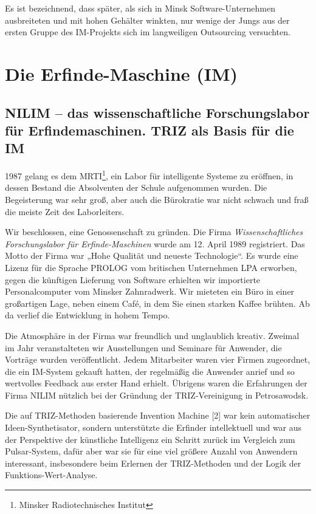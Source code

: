 \documentclass[11pt,a4paper]{article}
\begin{document}
Es ist bezeichnend, dass später, als sich in Minsk Software-Unternehmen
ausbreiteten und mit hohen Gehälter winkten, nur wenige der Jungs aus der
ersten Gruppe des IM-Projekts sich im langweiligen Outsourcing versuchten.

\section{Die Erfinde-Maschine (IM)}
\subsection{NILIM -- das wissenschaftliche Forschungslabor für
  Erfindemaschinen.  TRIZ als Basis für die IM}

1987 gelang es dem MRTI\footnote{Minsker Radiotechnisches Institut}, ein Labor
für intelligente Systeme zu eröffnen, in dessen Bestand die Absolventen der
Schule aufgenommen wurden. Die Begeisterung war sehr groß, aber auch die
Bürokratie war nicht schwach und fraß die meiste Zeit des Laborleiters.

Wir beschlossen, eine Genossenschaft zu gründen. Die Firma
\emph{Wissenschaftliches Forschungslabor für Erfinde-Maschinen} wurde am
12. April 1989 registriert. Das Motto der Firma war „Hohe Qualität und neueste
Technologie“. Es wurde eine Lizenz für die Sprache PROLOG vom britischen
Unternehmen LPA erworben, gegen die künftigen Lieferung von Software erhielten
wir importierte Personalcomputer vom Minsker Zahnradwerk. Wir mieteten ein
Büro in einer großartigen Lage, neben einem Café, in dem Sie einen starken
Kaffee brühten. Ab da verlief die Entwicklung in hohem Tempo.

Die Atmosphäre in der Firma war freundlich und unglaublich kreativ. Zweimal im
Jahr veranstalteten wir Ausstellungen und Seminare für Anwender, die Vorträge
wurden veröffentlicht. Jedem Mitarbeiter waren vier Firmen zugeordnet, die ein
IM-System gekauft hatten, der regelmäßig die Anwender anrief und so wertvolles
Feedback aus erster Hand erhielt. Übrigens waren die Erfahrungen der Firma
NILIM nützlich bei der Gründung der TRIZ-Vereinigung in Petrosawodsk.

Die auf TRIZ-Methoden basierende Invention Machine [2] war kein automatischer
Ideen-Synthetisator, sondern unterstützte die Erfinder intellektuell und war
aus der Perspektive der künstliche Intelligenz ein Schritt zurück im Vergleich
zum Pulsar-System, dafür aber war sie für eine viel größere Anzahl von
Anwendern interessant, insbesondere beim Erlernen der TRIZ-Methoden und der
Logik der Funktions-Wert-Analyse.
\end{document}
